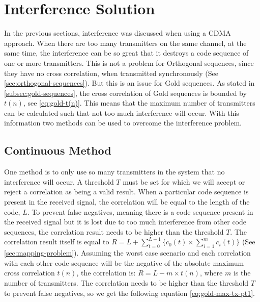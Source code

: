 
\section{Interference Solution}
\label{sec:interference-solution}

In the previous sections, interference was discussed when using a CDMA approach.
When there are too many transmitters on the same channel, at the same time, the interference can be so great that it destroys a code sequence of one or more transmitters.
This is not a problem for Orthogonal sequences, since they have no cross correlation, when transmitted synchronously (See \autoref{sec:orthogonal-sequences}).
But this is an issue for Gold sequences. 
As stated in \autoref{subsec:gold-sequences}, the cross correlation of Gold sequences is bounded by $t(n)$, see \autoref{eq:gold-t(n)}.
This means that the maximum number of transmitters can be calculated such that not too much interference will occur. 
With this information two methods can be used to overcome the interference problem.



\subsection{Continuous Method}


One method is to only use so many transmitters in the system that no interference will occur.
A threshold $T$ must be set for which we will accept or reject a correlation as being a valid result.
When a particular code sequence is present in the received signal, the correlation will be equal to the length of the code, $L$.
To prevent false negatives, meaning there is a code sequence present in the received signal but it is lost due to too much interference from other code sequences, the correlation result needs to be higher than the threshold $T$.
The correlation result itself is equal to $R = L + \displaystyle\sum_{t = 0} ^ {L - 1} \Bigg\{ c_0(t) \times  \displaystyle\sum_{i = 1} ^ {m} c_i(t) \Bigg\} $ (See \autoref{sec:mapping-problem}).
Assuming the worst case scenario and each correlation with each other code sequence will be the negative of the absolute maximum cross correlation $t(n)$, the correlation is: $R = L - m \times t(n)$, where $m$ is the number of transmitters.
The correlation needs to be higher than the threshold $T$ to prevent false negatives, so we get the following equation \autoref{eq:gold-max-tx-pt1}.

